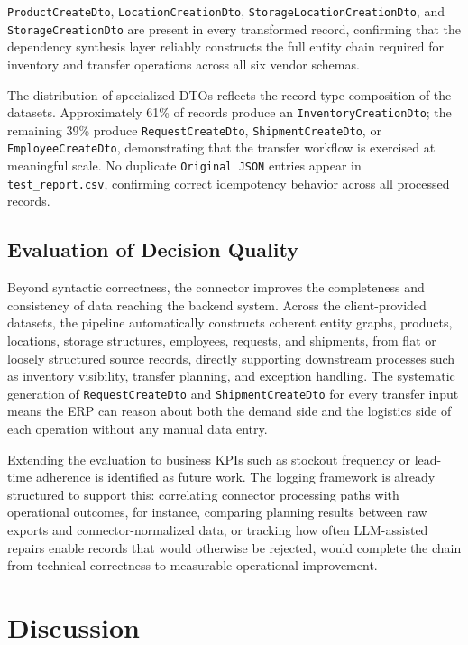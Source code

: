 \documentclass{article}
\begin{document}
\texttt{ProductCreateDto}, \texttt{LocationCreationDto}, \texttt{StorageLocationCreationDto},
and \texttt{StorageCreationDto} are present in every transformed record, confirming that the
dependency synthesis layer reliably constructs the full entity chain required for inventory
and transfer operations across all six vendor schemas.

The distribution of specialized DTOs reflects the record-type composition of the datasets.
Approximately 61\% of records produce an \texttt{InventoryCreationDto}; the remaining 39\%
produce \texttt{RequestCreateDto}, \texttt{ShipmentCreateDto}, or \texttt{EmployeeCreateDto},
demonstrating that the transfer workflow is exercised at meaningful scale.
No duplicate \texttt{Original JSON} entries appear in \texttt{test\_report.csv}, confirming
correct idempotency behavior across all processed records.



\subsection{Evaluation of Decision Quality}
Beyond syntactic correctness, the connector improves the completeness and consistency of data
reaching the backend system.
Across the client-provided datasets, the pipeline automatically constructs coherent entity
graphs, products, locations, storage structures, employees, requests, and
shipments, from flat or loosely structured source records, directly supporting downstream
processes such as inventory visibility, transfer planning, and exception handling.
The systematic generation of \texttt{RequestCreateDto} and \texttt{ShipmentCreateDto} for
every transfer input means the ERP can reason about both the demand side and the logistics
side of each operation without any manual data entry.

Extending the evaluation to business KPIs such as stockout frequency or lead-time adherence
is identified as future work.
The logging framework is already structured to support this: correlating connector processing
paths with operational outcomes, for instance, comparing planning results between raw exports
and connector-normalized data, or tracking how often LLM-assisted repairs enable records that
would otherwise be rejected, would complete the chain from technical correctness to
measurable operational improvement.


\section{Discussion}
\end{document}
